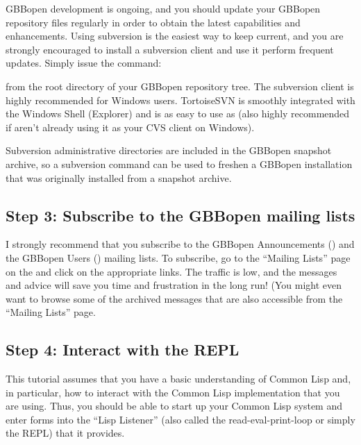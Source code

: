 \documentclass[10pt,twoside,english,pdftex]{article}
\begin{document}
%
%
%
%
%
GBBopen development is ongoing, and you should update your GBBopen repository
files regularly in order to obtain the latest capabilities and enhancements.
Using subversion is the easiest way to keep current, and you are strongly
encouraged to install a subversion client and use it perform frequent updates.
Simply issue the command:
%
\begin{example}\color{darkergray}%
  [~]$ \textcolor{black}{svn update}
\end{example}
%
from the root directory of your GBBopen repository tree.  
The  subversion
client is highly recommended for Windows users.  TortoiseSVN is
smoothly integrated with the Windows Shell (Explorer) and is as easy
to use as  (also
highly recommended if aren't already using it as your CVS client on
Windows).

Subversion  administrative directories are included in the
GBBopen snapshot archive, so a subversion  command can be
used to freshen a GBBopen installation that was originally installed
from a snapshot archive.

\subsection*{Step 3: Subscribe to the GBBopen mailing lists}

%
I strongly recommend that you subscribe to the GBBopen Announcements
() and the GBBopen Users ()
mailing lists.  To subscribe, go to the ``Mailing Lists'' page on the
 and click on the
appropriate  links.  The traffic is low, and the
messages and advice will save you time and frustration in the long
run!  (You might even want to browse some of the archived messages
that are also accessible from the ``Mailing Lists'' page.

\subsection*{Step 4: Interact with the REPL}

%
This tutorial assumes that you have a basic understanding of Common Lisp and,
in particular, how to interact with the Common Lisp implementation that you
are using.  Thus, you should be able to start up your Common Lisp system and
enter forms into the ``Lisp Listener'' (also called the read-eval-print-loop
or simply the REPL) that it provides.  
\end{document}
